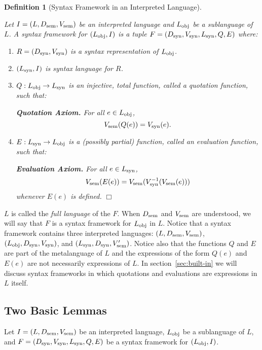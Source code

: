 \documentclass[11pt,fleqn]{article}
\newcommand{\be}{\begin{enumerate}}
\newcommand{\ee}{\end{enumerate}}
\newcommand{\bsp}{\begin{sloppypar}}
\newcommand{\esp}{\end{sloppypar}}
\newcommand{\tarrow}{\rightarrow}
\newtheorem{df}[thm]{Definition}
\begin{document}
\begin{df}[Syntax Framework in an Interpreted Language]\label{df:syn-frame-lang}\em
\bsp
Let $I=(L,D_{\rm sem},V_{\rm sem})$ be an interpreted language
and $L_{\rm obj}$ be a sublanguage of $L$.  A \emph{syntax framework}
for $(L_{\rm obj},I)$ is a tuple $F=(D_{\rm syn},V_{\rm syn}, L_{\rm
  syn}, Q, E)$ where:\esp

\be

  \item $R = (D_{\rm syn},V_{\rm syn})$ is a syntax representation of
    $L_{\rm obj}$.

  \item $(L_{\rm syn},I)$ is syntax language for $R$.

  \item $Q : L_{\rm obj} \tarrow L_{\rm syn}$ is an injective, total
    function, called a \emph{quotation function}, such that:

    \textbf{Quotation Axiom.} For all $e \in L_{\rm obj}$, \[V_{\rm
      sem}(Q(e)) = V_{\rm syn}(e).\]

  \item $E : L_{\rm syn} \tarrow L_{\rm obj}$ is a (possibly partial)
    function, called an \emph{evaluation function}, such that:

    \textbf{Evaluation Axiom.} For all $e \in L_{\rm syn}$, \[V_{\rm
      sem}(E(e)) = V_{\rm sem}(V_{\rm syn}^{-1}(V_{\rm sem}(e)))\]
    whenever $E(e)$ is defined. \hfill $\Box$

\ee 
\end{df}
\bsp \noindent $L$ is called the \emph{full language} of the $F$.
When $D_{\rm sem}$ and $V_{\rm sem}$ are understood, we will say that
$F$ is a syntax framework for $L_{\rm obj}$ in $L$.  Notice that a
syntax framework contains three interpreted languages: $(L,D_{\rm
  sem},V_{\rm sem})$, $(L_{\rm obj},D_{\rm syn},V_{\rm syn})$, and
$(L_{\rm syn}, D_{\rm syn}, V'_{\rm sem})$.  Notice also that the
functions $Q$ and $E$ are part of the metalanguage of $L$ and the
expressions of the form $Q(e)$ and $E(e)$ are not necessarily
expressions of $L$.  In section~\ref{sec:built-in} we will discuss
syntax frameworks in which quotations and evaluations are expressions
in $L$ itself. \esp

\subsection{Two Basic Lemmas}

\bsp Let $I=(L,D_{\rm sem},V_{\rm sem})$ be an interpreted language,
$L_{\rm obj}$ be a sublanguage of $L$, and $F=(D_{\rm syn}, V_{\rm
  syn}, L_{\rm syn}, Q, E)$ be a syntax framework for $(L_{\rm
  obj},I)$. \esp
\end{document}
